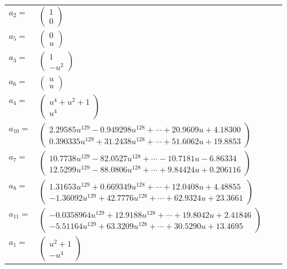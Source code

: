 \documentclass[1p]{elsarticle_modified}
\theoremstyle{definition}
\begin{document}
\begin{tabular}{m{7pt} m{180pt} m{7pt} m{180pt} }
\flushright $a_{2}=$&$\begin{pmatrix}1\\0\end{pmatrix}$ \\
\flushright $a_{5}=$&$\begin{pmatrix}0\\u\end{pmatrix}$ \\
\flushright $a_{3}=$&$\begin{pmatrix}1\\- u^2\end{pmatrix}$ \\
\flushright $a_{6}=$&$\begin{pmatrix}u\\u\end{pmatrix}$ \\
\flushright $a_{4}=$&$\begin{pmatrix}u^4+u^2+1\\u^4\end{pmatrix}$ \\
\flushright $a_{10}=$&$\begin{pmatrix}2.29585 u^{129}-0.949298 u^{128}+\cdots+20.9609 u+4.18300\\0.390335 u^{129}+31.2438 u^{128}+\cdots+51.6062 u+19.8853\end{pmatrix}$ \\
\flushright $a_{7}=$&$\begin{pmatrix}10.7738 u^{129}-82.0527 u^{128}+\cdots-10.7181 u-6.86334\\12.5299 u^{129}-88.0806 u^{128}+\cdots+9.84424 u+0.206116\end{pmatrix}$ \\
\flushright $a_{8}=$&$\begin{pmatrix}1.31653 u^{129}+0.669349 u^{128}+\cdots+12.0408 u+4.48855\\-1.36092 u^{129}+42.7776 u^{128}+\cdots+62.9324 u+23.3661\end{pmatrix}$ \\
\flushright $a_{11}=$&$\begin{pmatrix}-0.0358964 u^{129}+12.9188 u^{128}+\cdots+19.8042 u+2.41846\\-5.51164 u^{129}+63.3209 u^{128}+\cdots+30.5290 u+13.4695\end{pmatrix}$ \\
\flushright $a_{1}=$&$\begin{pmatrix}u^2+1\\- u^4\end{pmatrix}$ \\

\end{tabular}
\end{document}

